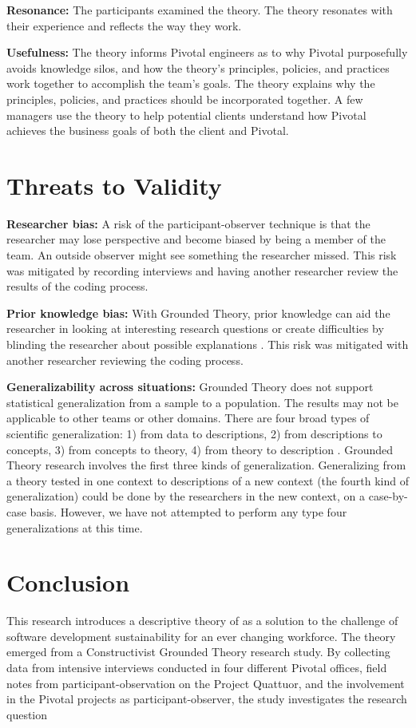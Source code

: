 \textbf{Resonance:} The participants examined the theory. The theory resonates with their experience and reflects the way they work.

\textbf{Usefulness:} The theory informs Pivotal engineers as to why Pivotal purposefully avoids knowledge silos, and how the theory's principles, policies, and practices work together to accomplish the team's goals. The theory explains why the principles, policies, and practices should be incorporated together. A few managers use  the theory to help potential clients understand how Pivotal achieves the business goals of both the client and Pivotal.

\section{Threats to Validity}

\textbf{Researcher bias:} A risk of the participant-observer technique is that the researcher may lose perspective and become biased by being a member of the team. An outside observer might see something the researcher missed. This risk was mitigated by recording interviews and having another researcher review the results of the coding process.

\textbf{Prior knowledge bias:} With Grounded Theory, prior knowledge can aid the researcher in looking at interesting research questions or create difficulties by blinding the researcher about possible explanations \cite{GlaserIssues}. This risk was mitigated with another researcher reviewing the coding process. 

\textbf{Generalizability across situations:} Grounded Theory does not support statistical generalization from a sample to a population. The results may not be applicable to other teams or other domains. There are four broad types of scientific generalization: 1) from data to descriptions, 2) from descriptions to concepts, 3) from concepts to theory, 4) from theory to description \cite{Lee2003generalizing}. Grounded Theory research involves the first three kinds of generalization. Generalizing from a theory tested in one context to descriptions of a new context (the fourth kind of generalization) could be done by the researchers in the new context, on a case-by-case basis. However, we have not attempted to perform any type four generalizations at this time.

\section{Conclusion}
This research introduces a descriptive theory of  as a solution to the challenge of software development sustainability for an ever changing workforce. The theory emerged from a Constructivist Grounded Theory research study. By collecting data from \numberOfInterviews{} intensive interviews conducted in four different Pivotal offices, field notes from participant-observation on the Project Quattuor, and the involvement in the \numberOfObservedProjects{} Pivotal projects as participant-observer, the study investigates the research question 

